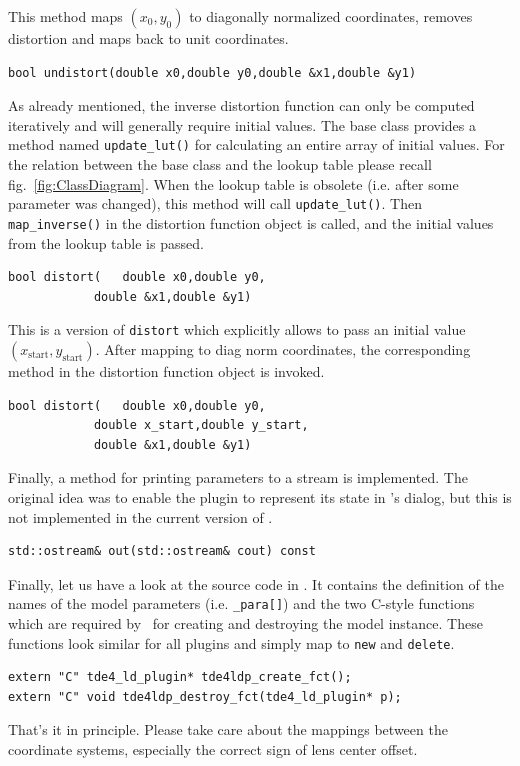 \documentclass[10pt,a4paper]{article}
\begin{document}
This method maps $(x_0,y_0)$ to diagonally normalized coordinates,
removes distortion and maps back to unit coordinates.
\begin{lstlisting}[language=mycpp,tabsize=8]
	bool undistort(double x0,double y0,double &x1,double &y1)
\end{lstlisting}
As already mentioned, the inverse distortion function can only be computed
iteratively and will generally require initial values. The base class provides
a method named {\tt update\_lut()} for calculating an entire array of initial values.
For the relation between the base class and the lookup table please recall
fig.~\ref{fig:ClassDiagram}. When the lookup table is obsolete (i.e. after some parameter was changed),
this method will call {\tt update\_lut()}. Then {\tt map\_inverse()} in the distortion function object
is called, and the initial values from the lookup table is passed.
\begin{lstlisting}[language=mycpp,tabsize=8]
	bool distort(	double x0,double y0,
			double &x1,double &y1)
\end{lstlisting}
This is a version of {\tt distort} which explicitly allows to pass
an initial value $(x_\mathrm{start},y_\mathrm{start})$.
After mapping to diag norm coordinates, the corresponding method
in the distortion function object is invoked.
\begin{lstlisting}[language=mycpp,tabsize=8]
	bool distort(	double x0,double y0,
			double x_start,double y_start,
			double &x1,double &y1)
\end{lstlisting}
Finally, a method for printing parameters to a stream is implemented.
The original idea was to enable the plugin to represent its state in \tde's
 dialog, but this is not implemented in the current version of \tde.
\begin{lstlisting}[language=mycpp,tabsize=8]
	std::ostream& out(std::ostream& cout) const
\end{lstlisting}
Finally, let us have a look at the source code in
.
It contains the definition of the names of the model parameters (i.e. {\tt\_para[]})
and the two C-style functions which are required by \tde\ for
creating and destroying the model instance. These functions look similar
for all plugins and simply map to {\tt new} and {\tt delete}.
\begin{lstlisting}[language=mycpp,tabsize=8]
extern "C" tde4_ld_plugin* tde4ldp_create_fct();
extern "C" void tde4ldp_destroy_fct(tde4_ld_plugin* p);
\end{lstlisting}
That's it in principle. Please take care about the mappings between the coordinate
systems, especially the correct sign of lens center offset.
\end{document}
